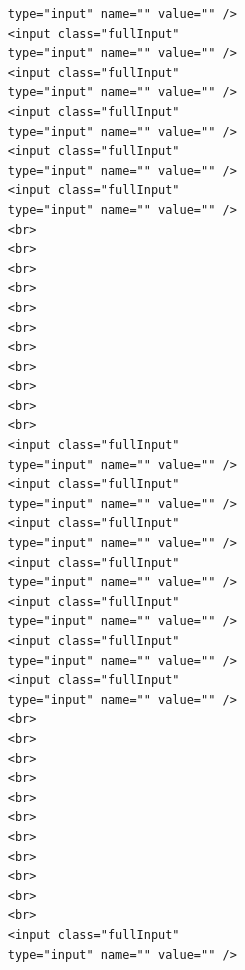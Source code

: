 \documentclass[12pt]{report} %
\begin{document}
\begin{verbatim}
                                    type="input" name="" value="" />
                                    <input class="fullInput"
                                    type="input" name="" value="" />
                                    <input class="fullInput"
                                    type="input" name="" value="" />
                                    <input class="fullInput"
                                    type="input" name="" value="" />
                                    <input class="fullInput"
                                    type="input" name="" value="" />
                                    <input class="fullInput"
                                    type="input" name="" value="" />
                                    <br>
                                    <br>
                                    <br>
                                    <br>
                                    <br>
                                    <br>
                                    <br>
                                    <br>
                                    <br>
                                    <br>
                                    <br>
                                    <input class="fullInput"
                                    type="input" name="" value="" />
                                    <input class="fullInput"
                                    type="input" name="" value="" />
                                    <input class="fullInput"
                                    type="input" name="" value="" />
                                    <input class="fullInput"
                                    type="input" name="" value="" />
                                    <input class="fullInput"
                                    type="input" name="" value="" />
                                    <input class="fullInput"
                                    type="input" name="" value="" />
                                    <input class="fullInput"
                                    type="input" name="" value="" />
                                    <br>
                                    <br>
                                    <br>
                                    <br>
                                    <br>
                                    <br>
                                    <br>
                                    <br>
                                    <br>
                                    <br>
                                    <br>
                                    <input class="fullInput"
                                    type="input" name="" value="" />

\end{verbatim}
\end{document}
